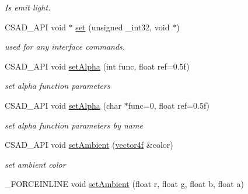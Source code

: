 \begin{DoxyCompactItemize}
\begin{DoxyCompactList}\small\item\em Is emit light. \end{DoxyCompactList}\item 
\hypertarget{classcsad_1_1_material_a82d954d2ec389cd90f52d3a1bdbb3b87}{C\-S\-A\-D\-\_\-\-A\-P\-I void $\ast$ \hyperlink{classcsad_1_1_material_a82d954d2ec389cd90f52d3a1bdbb3b87}{set} (unsigned \-\_\-int32, void $\ast$)}\label{classcsad_1_1_material_a82d954d2ec389cd90f52d3a1bdbb3b87}

\begin{DoxyCompactList}\small\item\em used for any interface commands. \end{DoxyCompactList}\item 
\hypertarget{classcsad_1_1_material_a85b4dfb6502863b0b896352b29d0bc74}{C\-S\-A\-D\-\_\-\-A\-P\-I void \hyperlink{classcsad_1_1_material_a85b4dfb6502863b0b896352b29d0bc74}{set\-Alpha} (int func, float ref=0.\-5f)}\label{classcsad_1_1_material_a85b4dfb6502863b0b896352b29d0bc74}

\begin{DoxyCompactList}\small\item\em set alpha function parameters \end{DoxyCompactList}\item 
\hypertarget{classcsad_1_1_material_a71d48f2425e2fc61ef2546350a70e88e}{C\-S\-A\-D\-\_\-\-A\-P\-I void \hyperlink{classcsad_1_1_material_a71d48f2425e2fc61ef2546350a70e88e}{set\-Alpha} (char $\ast$func=0, float ref=0.\-5f)}\label{classcsad_1_1_material_a71d48f2425e2fc61ef2546350a70e88e}

\begin{DoxyCompactList}\small\item\em set alpha function parameters by name \end{DoxyCompactList}\item 
\hypertarget{classcsad_1_1_material_a7b0a7a87159a7dd02dfd809404ed53cc}{C\-S\-A\-D\-\_\-\-A\-P\-I void \hyperlink{classcsad_1_1_material_a7b0a7a87159a7dd02dfd809404ed53cc}{set\-Ambient} (\hyperlink{classbt_1_1vector4f}{vector4f} \&color)}\label{classcsad_1_1_material_a7b0a7a87159a7dd02dfd809404ed53cc}

\begin{DoxyCompactList}\small\item\em set ambient color \end{DoxyCompactList}\item 
\hypertarget{classcsad_1_1_material_a1d6d882d09da03fa06ed88c0a370e330}{\-\_\-\-F\-O\-R\-C\-E\-I\-N\-L\-I\-N\-E void \hyperlink{classcsad_1_1_material_a1d6d882d09da03fa06ed88c0a370e330}{set\-Ambient} (float r, float g, float b, float a)}\label{classcsad_1_1_material_a1d6d882d09da03fa06ed88c0a370e330}


\end{DoxyCompactItemize}
